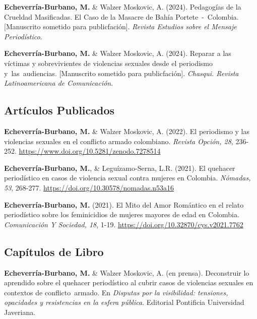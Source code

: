 \documentclass[11pt,a4paper,]{awesome-cv}
\begin{document}
\begingroup
\setlength{\parindent}{-0.5in}
\setlength{\leftskip}{0.5in}

\textbf{Echeverría-Burbano, M.} \& Walzer Moskovic, A. (2024).
Pedagogías de la Crueldad Masificadas. El Caso de la Masacre de Bahía
Portete~-~Colombia. {[}Manuscrito sometido para publicfación{]}.
\emph{Revista Estudios sobre el Mensaje Periodístico}.

\textbf{Echeverría-Burbano, M.} \& Walzer Moskovic, A. (2024). Reparar a
las víctimas y sobrevivientes de violencias sexuales desde el periodismo
y~las~audiencias. {[}Manuscrito sometido para publicfación{]}.
\emph{Chasqui. Revista Latinoamericana de Comunicación}.

\endgroup

\hypertarget{section-1}{%
\subsection{\texorpdfstring{\textbf{Artículos Publicados}}{}}\label{section-1}}

\begingroup
\setlength{\parindent}{-0.5in}
\setlength{\leftskip}{0.5in}

\textbf{Echeverría-Burbano, M.} \& Walzer Moskovic, A. (2022). El
periodismo y las violencias sexuales en el conflicto armado colombiano.
\emph{Revista Opción, 28}, 236-252.
\url{https://www.doi.org/10.5281/zenodo.7278514}

\textbf{Echeverría-Burbano, M.}, \& Leguízamo-Serna, L.R. (2021). El
quehacer periodístico en casos de violencia sexual contra mujeres en
Colombia. \emph{Nómadas, 53}, 268-277.
\url{https://doi.org/10.30578/nomadas.n53a16}

\textbf{Echeverría-Burbano, M.} (2021). El Mito del Amor Romántico en el
relato periodístico sobre los feminicidios de mujeres mayores de edad en
Colombia. \emph{Comunicación Y Sociedad, 18}, 1-19.
\url{https://doi.org/10.32870/cys.v2021.7762}

\endgroup

\hypertarget{section-2}{%
\subsection{\texorpdfstring{\textbf{Capítulos de Libro}}{}}\label{section-2}}

\begingroup
\setlength{\parindent}{-0.5in}
\setlength{\leftskip}{0.5in}

\textbf{Echeverría-Burbano, M.} \& Walzer Moskovic, A. (en prensa).
Deconstruir lo aprendido sobre el quehacer periodístico al cubrir casos
de violencias sexuales en contextos de conflicto~armado. En
\emph{Disputas por la visibilidad: tensiones, opacidades y resistencias
en la esfera pública}. Editorial Pontificia Universidad Javeriana.
\end{document}
